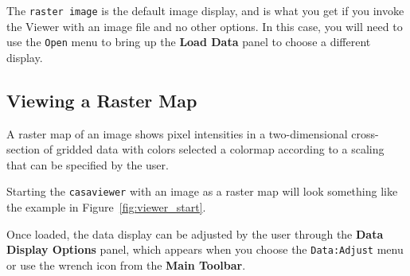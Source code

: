 The {\tt raster image} is the default image display, and is what you
get if you invoke the Viewer with an image file and no other options.  
In this case, you will need to use the {\tt Open} menu to
bring up the {\bf Load Data} panel to choose a different display.

%


\subsection{Viewing a Raster Map}
\label{section:display.image.raster}

A raster map of an image shows pixel intensities in a two-dimensional
cross-section of gridded data with colors selected a colormap according
to a scaling that can be specified by the user. 


Starting the {\tt casaviewer} 
with an image as a raster map will look
something like the example in Figure~\ref{fig:viewer_start}. 

Once loaded, the data display can be adjusted by the user 
through the {\bf Data Display Options} panel, which
appears when you choose the {\tt Data:Adjust} menu or use the
wrench icon from the {\bf Main Toolbar}.

